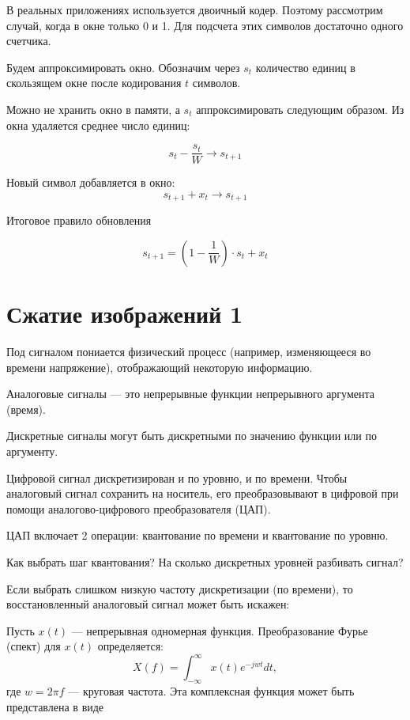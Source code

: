{

В реальных приложениях используется двоичный кодер. Поэтому рассмотрим случай,
когда в окне только 0 и 1. Для подсчета этих символов достаточно одного
счетчика.

Будем аппроксимировать окно. Обозначим через $s_t$ количество единиц в
скользящем окне после кодирования $t$ символов.

Можно не хранить окно в памяти, а $s_t$ аппроксимировать следующим образом. Из
окна удаляется среднее число единиц:

\[
    s_t - \frac{s_t}{W} \to s_{t+1}
\]

Новый символ добавляется в окно:
\[
    s_{t+1} + x_t \to s_{t+1}
\]

Итоговое правило обновления

\[
    s_{t+1} = (1 - \frac{1}{W}) \cdot s_t + x_t
\]

\section{Сжатие изображений 1}

Под сигналом пониается физический процесс (например, изменяющееся во времени
напряжение), отображающий некоторую информацию.

Аналоговые сигналы --- это непрерывные функции непрерывного аргумента (время).

Дискретные сигналы могут быть дискретными по значению функции или по аргументу.

Цифровой сигнал дискретизирован и по уровню, и по времени. Чтобы аналоговый
сигнал сохранить на носитель, его преобразовывают в цифровой при помощи
аналогово-цифрового преобразователя (ЦАП).

ЦАП включает 2 операции: квантование по времени и квантование по уровню.

Как выбрать шаг квантования? На сколько дискретных уровней разбивать сигнал?


Если выбрать слишком низкую частоту дискретизации (по времени), то
восстановленный аналоговый сигнал может быть искажен:


Пусть $x(t)$ --- непрерывная одномерная функция. Преобразование Фурье (спект)
для $x(t)$ определяется:
\[
    X(f) = \int_{-\infty}^{\infty} x(t) e^{-jwt} dt,
\] где $w = 2\pi f$ --- круговая частота. Эта комплексная функция может быть
представлена в виде

}
